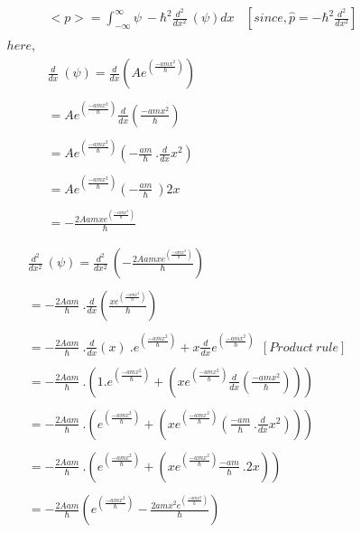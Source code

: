 \documentclass{article}
\begin{document}
\begin{homeworkProblem}
\begin{align*}
   &<p> =\int_{-\infty}^{\infty}\psi \ -\hbar^{2}\frac{d^{2}}{dx^{2}}\ (\psi) dx \ \ \ \ [since,\hat{p} =-\hbar^{2}\frac{d^{2}}{dx^{2}}] \\\\
   here,\\
   &\frac{d}{dx}\ (\psi)= \frac{d}{dx}(A e^{( \frac{-amx^{2}}{\hbar})})\\\\
   &= A e^{( \frac{-amx^{2}}{\hbar})}\frac{d}{dx}(\frac{-amx^{2}}{\hbar})\\\\
   &= A e^{( \frac{-amx^{2}}{\hbar})}(-\frac{am}{\hbar}\ . \frac{d}{dx}{x^{2}})\\\\
   &=A e^{( \frac{-amx^{2}}{\hbar})}(-\frac{am}{\hbar}\ )2x\\\\
   &=-\frac{2 Aamx e^{( \frac{-amx^{2}}{\hbar})}}{\hbar}\\\\
\end{align*}
\newpage\vspace{5mm}
\hspace{20mm}
\large
\begin{align*}
   &\frac{d^{2}}{dx^{2}}\ (\psi)= \frac{d^{2}}{dx^{2}}\ (-\frac{2 Aamx e^{( \frac{-amx^{2}}{\hbar})}}{\hbar})\\\\
   &=-\frac{2 Aam}{\hbar}\ . \frac{d}{dx}(\frac{xe^{( \frac{-amx^{2}}{\hbar})}}{{\hbar}})\\\\
   &=-\frac{2 Aam}{\hbar}\ . \frac{d}{dx}(x)\ . e^{( \frac{-amx^{2}}{\hbar})}+x \frac{d}{dx}e^{( \frac{-amx^{2}}{\hbar})}\ \ [Product\ rule]\\\\
   &=-\frac{2 Aam}{\hbar}\ . ( 1 . e^{( \frac{-amx^{2}}{\hbar})}+ (xe^{( \frac{-amx^{2}}{\hbar})}\frac{d}{dx}( \frac{-amx^{2}}{\hbar})))\\\\
   &=-\frac{2 Aam}{\hbar}\ . ( e^{( \frac{-amx^{2}}{\hbar})}+ (xe^{( \frac{-amx^{2}}{\hbar})}( \frac{-am}{\hbar}\ . \frac{d}{dx}{x^{2}})))\\\\
   &=-\frac{2 Aam}{\hbar}\ . ( e^{( \frac{-amx^{2}}{\hbar})}+ (xe^{( \frac{-amx^{2}}{\hbar})} \frac{-am}{\hbar} \ . 2x))\\\\
   &=-\frac{2 Aam}{\hbar}( e^{( \frac{-amx^{2}}{\hbar})} -\frac{2amx^{2} e^{( \frac{-amx^{2}}{\hbar})}}{\hbar}) \\\\

\end{align*}
\end{homeworkProblem}
\end{document}

